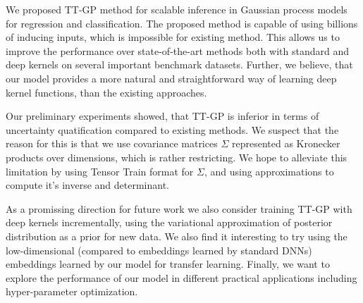 We proposed TT-GP method for scalable inference in Gaussian process models
for regression and classification.  The proposed method is capable of using 
billions of inducing
inputs, which is impossible for existing method. This allows us to improve the 
performance over state-of-the-art methods both with standard and deep kernels 
on several important benchmark datasets. 
Further, we believe, that our model provides a more natural and straightforward
way of learning deep kernel functions, than the existing approaches.

Our preliminary experiments showed, that TT-GP is inferior in terms of 
uncertainty quatification compared to existing methods. We suspect that the 
reason for this is that we use covariance matrices $\Sigma$ represented as
Kronecker products over dimensions, which is rather restricting. We hope to 
alleviate this limitation by using Tensor Train format for $\Sigma$, and using 
approximations to compute it's inverse and determinant.

As a promissing direction for future work we also consider training TT-GP
with deep kernels incrementally, using the variational approximation
of posterior distribution as a prior for new data. We also find it interesting
to try using the low-dimensional (compared to embeddings learned by standard DNNs)
embeddings learned by our model for transfer learning. Finally, we want to
explore the performance of our model in different practical applications
including hyper-parameter optimization.
